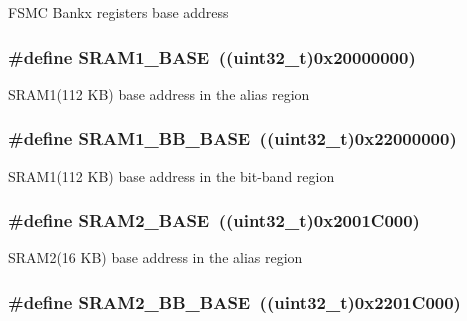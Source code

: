 F\-S\-M\-C Bankx registers base address \hypertarget{group___peripheral__memory__map_ga7d0fbfb8894012dbbb96754b95e562cd}{
\subsubsection[{S\-R\-A\-M1\-\_\-\-B\-A\-S\-E}]{\setlength{\rightskip}{0pt plus 5cm}\#define S\-R\-A\-M1\-\_\-\-B\-A\-S\-E~((uint32\-\_\-t)0x20000000)}}\label{group___peripheral__memory__map_ga7d0fbfb8894012dbbb96754b95e562cd}
S\-R\-A\-M1(112 K\-B) base address in the alias region \hypertarget{group___peripheral__memory__map_gac4c4f61082e4b168f29d9cf97dc3ca5c}{
\subsubsection[{S\-R\-A\-M1\-\_\-\-B\-B\-\_\-\-B\-A\-S\-E}]{\setlength{\rightskip}{0pt plus 5cm}\#define S\-R\-A\-M1\-\_\-\-B\-B\-\_\-\-B\-A\-S\-E~((uint32\-\_\-t)0x22000000)}}\label{group___peripheral__memory__map_gac4c4f61082e4b168f29d9cf97dc3ca5c}
S\-R\-A\-M1(112 K\-B) base address in the bit-\/band region \hypertarget{group___peripheral__memory__map_gadbb42a3d0a8a90a79d2146e4014241b1}{
\subsubsection[{S\-R\-A\-M2\-\_\-\-B\-A\-S\-E}]{\setlength{\rightskip}{0pt plus 5cm}\#define S\-R\-A\-M2\-\_\-\-B\-A\-S\-E~((uint32\-\_\-t)0x2001\-C000)}}\label{group___peripheral__memory__map_gadbb42a3d0a8a90a79d2146e4014241b1}
S\-R\-A\-M2(16 K\-B) base address in the alias region \hypertarget{group___peripheral__memory__map_gac33cb6edadf184ab9860d77089503922}{
\subsubsection[{S\-R\-A\-M2\-\_\-\-B\-B\-\_\-\-B\-A\-S\-E}]{\setlength{\rightskip}{0pt plus 5cm}\#define S\-R\-A\-M2\-\_\-\-B\-B\-\_\-\-B\-A\-S\-E~((uint32\-\_\-t)0x2201\-C000)}}\label{group___peripheral__memory__map_gac33cb6edadf184ab9860d77089503922}
